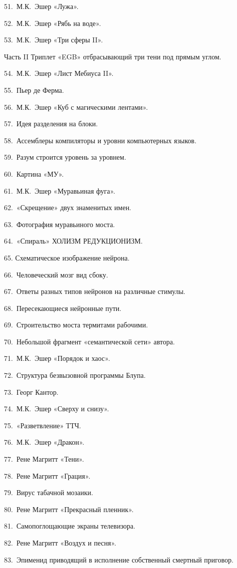 \documentclass[../main.tex]{subfiles}
\begin{document}
51.~М.К.~Эшер «Лужа».

52.~М.К.~Эшер «Рябь на воде».

53.~М.К.~Эшер «Три сферы II».

Часть II Триплет «EGB» отбрасывающий три тени под прямым углом.

54.~М.К.~Эшер «Лист Мебиуса II».

55.~Пьер де Ферма.

56.~М.К.~Эшер «Куб с магическими лентами».

57.~Идея разделения на блоки.

58.~Ассемблеры компиляторы и уровни компьютерных языков.

59.~Разум строится уровень за уровнем.

60.~Картина «МУ».

61.~М.К.~Эшер «Муравьиная фуга».

62.~«Скрещение» двух знаменитых имен.

63.~Фотография муравьиного моста.

64.~«Спираль» ХОЛИЗМ РЕДУКЦИОНИЗМ.

65. Схематическое изображение нейрона.

66.~Человеческий мозг вид сбоку.

67.~Ответы разных типов нейронов на различные стимулы.

68.~Пересекающиеся нейронные пути.

69.~Строительство моста термитами рабочими.

70.~Небольшой фрагмент «семантической сети» автора.

71.~М.К.~Эшер «Порядок и хаос».

72.~Структура безвызовной программы Блупа.

73.~Георг Кантор.

74.~М.К.~Эшер «Сверху и снизу».

75.~«Разветвление» ТТЧ.

76.~М.К.~Эшер «Дракон».

77.~Рене Магритт «Тени».

78.~Рене Магритт «Грация».

79.~Вирус табачной мозаики.

80.~Рене Магритт «Прекрасный пленник».

81.~Самопоглощающие экраны телевизора.

82.~Рене Магритт «Воздух и песня».

83.~Эпименид приводящий в исполнение собственный смертный приговор.
\end{document}
